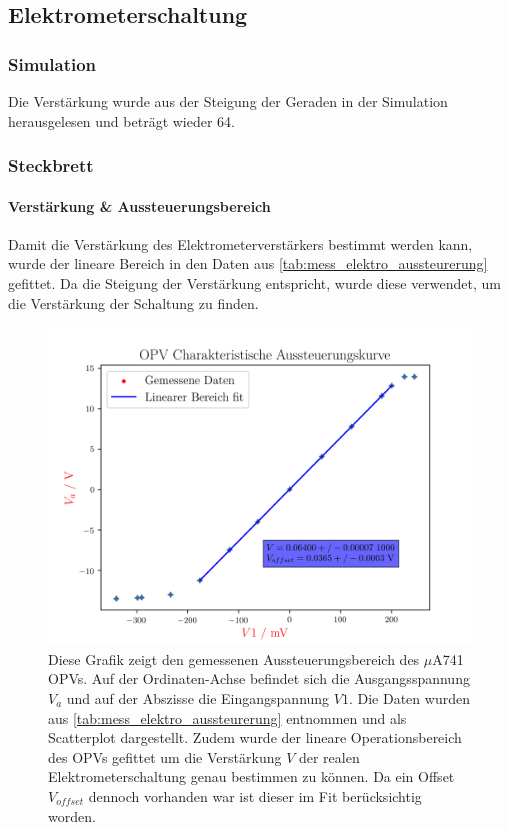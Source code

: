 \documentclass[12pt,english,ngerman]{scrartcl}
\begin{document}
\subsection{Elektrometerschaltung}

\subsubsection{Simulation}
Die Verstärkung wurde aus der Steigung der Geraden in der Simulation herausgelesen und beträgt wieder \num{64}.


\subsubsection{Steckbrett}
\paragraph{Verstärkung \& Aussteuerungsbereich}
Damit die Verstärkung des Elektrometerverstärkers bestimmt werden kann, wurde
der lineare Bereich in den Daten aus \autoref{tab:mess_elektro_aussteurerung}
gefittet. Da die Steigung der Verstärkung entspricht, wurde diese verwendet, um
die Verstärkung der Schaltung zu finden.

\begin{figure}[H]
  \centering
    \includegraphics[width=\linewidth]{./Output/OPV/opvmessung.png}
    \caption{Diese Grafik zeigt den gemessenen Aussteuerungsbereich des
    $\mu$A741 OPVs. Auf der Ordinaten-Achse befindet sich die Ausgangsspannung
    $V_a$ und auf der Abszisse die Eingangspannung $V1$. Die Daten wurden aus
    \autoref{tab:mess_elektro_aussteurerung} entnommen und als Scatterplot
    dargestellt. Zudem wurde der lineare Operationsbereich des OPVs gefittet um
  die Verstärkung $V$ der realen Elektrometerschaltung genau bestimmen zu
können. Da ein Offset $V_{offset}$ dennoch vorhanden war ist dieser im Fit
berücksichtig worden.}
  \label{fig:gemessene_aussteuerungskurve}
\end{figure}
\end{document}
